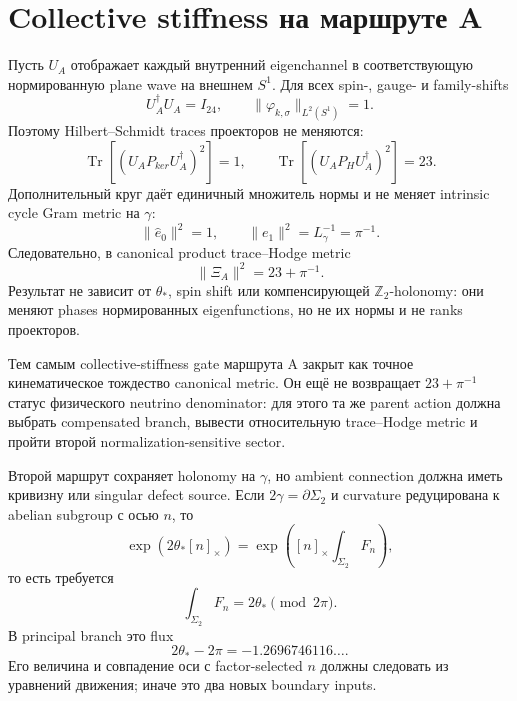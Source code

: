 \section{Collective stiffness на маршруте A}

Пусть \(U_A\) отображает каждый внутренний eigenchannel в соответствующую
нормированную plane wave на внешнем \(S^1\). Для всех spin-, gauge- и
family-shifts
\begin{equation}
 U_A^\dagger U_A=I_{24},
 \qquad
 \|\varphi_{k,\sigma}\|_{L^2(S^1)}=1.
\end{equation}
Поэтому Hilbert--Schmidt traces проекторов не меняются:
\begin{equation}
 \operatorname{Tr}\!\left[(U_AP_{ker}U_A^\dagger)^2\right]=1,
 \qquad
 \operatorname{Tr}\!\left[(U_AP_HU_A^\dagger)^2\right]=23.
\end{equation}
Дополнительный круг даёт единичный множитель нормы и не меняет intrinsic
cycle Gram metric на \(\gamma\):
\begin{equation}
 \|\widehat e_0\|^2=1,
 \qquad
 \|e_1\|^2=L_\gamma^{-1}=\pi^{-1}.
\end{equation}
Следовательно, в canonical product trace--Hodge metric
\begin{equation}
 \boxed{\|\Xi_A\|^2=23+\pi^{-1}.}
\end{equation}
Результат не зависит от \(\theta_*\), spin shift или компенсирующей
\(\mathbb Z_2\)-holonomy: они меняют phases нормированных eigenfunctions, но
не их нормы и не ranks проекторов.

Тем самым collective-stiffness gate маршрута A закрыт как точное
кинематическое тождество canonical metric. Он ещё не возвращает
\(23+\pi^{-1}\) статус физического neutrino denominator: для этого та же
parent action должна выбрать compensated branch, вывести относительную
trace--Hodge metric и пройти второй normalization-sensitive sector.

Второй маршрут сохраняет holonomy на \(\gamma\), но ambient connection
должна иметь кривизну или singular defect source. Если \(2\gamma=\partial
\Sigma_2\) и curvature редуцирована к abelian subgroup с осью \(n\), то
\begin{equation}
 \exp(2\theta_*[n]_\times)
 =\exp\left([n]_\times\int_{\Sigma_2}F_n\right),
\end{equation}
то есть требуется
\begin{equation}
 \int_{\Sigma_2}F_n=2\theta_*\pmod{2\pi}.
\end{equation}
В principal branch это flux
\begin{equation}
 2\theta_*-2\pi=-1.2696746116\ldots.
\end{equation}
Его величина и совпадение оси с factor-selected \(n\) должны следовать из
уравнений движения; иначе это два новых boundary inputs.

